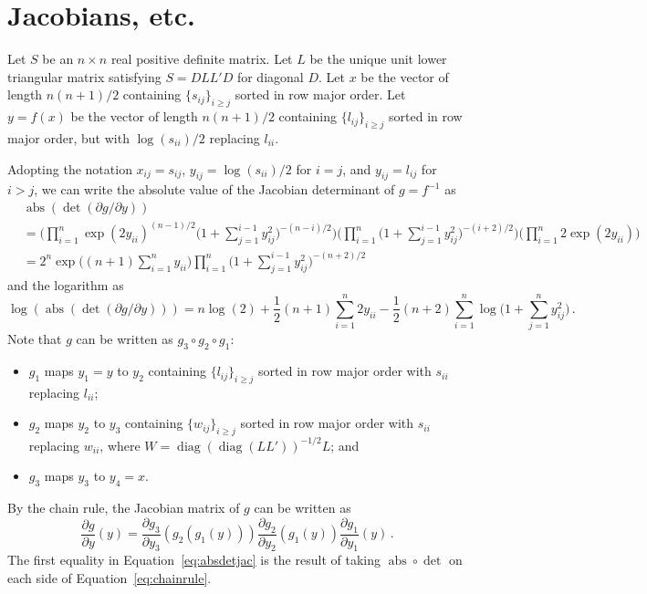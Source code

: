 \documentclass[12pt]{article}
\DeclareMathOperator{\abs}{abs}
\DeclareMathOperator{\diag}{diag}
\begin{document}
\setlength{\parskip}{5mm}
\setlength{\parindent}{0mm}
\section{Jacobians, etc.}

Let $S$ be an $n \times n$ real positive definite matrix.  Let $L$ be
the unique unit lower triangular matrix satisfying $S = D L L' D$ for
diagonal $D$.  Let $x$ be the vector of length $n (n + 1)/2$ containing
$\{s_{ij}\}_{i \geq j}$ sorted in row major order.  Let $y = f(x)$ be
the vector of length $n (n + 1)/2$ containing $\{l_{ij}\}_{i \geq j}$
sorted in row major order, but with $\log(s_{ii})/2$ replacing $l_{ii}$.

Adopting the notation
$x_{ij} = s_{ij}$,
$y_{ij} = \log(s_{ii}) / 2$ for $i = j$, and
$y_{ij} = l_{ij}$ for $i > j$,
we can write the absolute value of the Jacobian determinant of
$g = f^{-1}$ as
\begin{equation}
\label{eq:absdetjac}
\begin{aligned}
&\abs(\det(\partial g/\partial y)) \\
&= \Big( \prod_{i=1}^{n} \exp(2 y_{ii})^{(n-1)/2} \Big( 1 + \sum_{j=1}^{i-1} y_{ij}^{2} \Big)^{-(n-i)/2} \Big) \Big( \prod_{i=1}^{n} \Big( 1 + \sum_{j=1}^{i-1} y_{ij}^{2} \Big)^{-(i+2)/2} \Big) \Big( \prod_{i=1}^{n} 2 \exp(2 y_{ii}) \Big) \\
&= 2^{n} \exp\Big((n + 1) \sum_{i=1}^{n} y_{ii}\Big) \prod_{i=1}^{n} \Big( 1 + \sum_{j=1}^{i-1} y_{ij}^{2} \Big)^{-(n+2)/2}
\end{aligned}
\end{equation}
and the logarithm as
\begin{equation}
\log(\abs(\det(\partial g/\partial y))) = n \log(2) + \frac{1}{2} (n + 1) \sum_{i=1}^{n} 2 y_{ii} - \frac{1}{2} (n + 2) \sum_{i=1}^{n} \log\Big( 1 + \sum_{j=1}^{n} y_{ij}^{2}\Big)\,.
\end{equation}
Note that $g$ can be written as $g_{3} \circ g_{2} \circ g_{1}$:
\begin{itemize}
\item
$g_{1}$ maps $y_{1} = y$ to $y_{2}$ containing
$\{l_{ij}\}_{i \geq j}$ sorted in row major order with $s_{ii}$
replacing $l_{ii}$;
\item
$g_{2}$ maps $y_{2}$     to $y_{3}$ containing
$\{w_{ij}\}_{i \geq j}$ sorted in row major order with $s_{ii}$
replacing $w_{ii}$, where $W = \diag(\diag(L L'))^{-1/2} L$; and
\item
$g_{3}$ maps $y_{3}$     to $y_{4} = x$.
\end{itemize}
By the chain rule, the Jacobian matrix of $g$ can be written as
\begin{equation}
\label{eq:chainrule}
\frac{\partial g}{\partial y}(y) =
\frac{\partial g_{3}}{\partial y_{3}}(g_{2}(g_{1}(y)))
\frac{\partial g_{2}}{\partial y_{2}}(      g_{1}(y) )
\frac{\partial g_{1}}{\partial y_{1}}(            y  )\,.
\end{equation}
The first equality in Equation~\ref{eq:absdetjac} is the result of
taking $\abs \circ \det$ on each side of Equation~\ref{eq:chainrule}.
\end{document}
